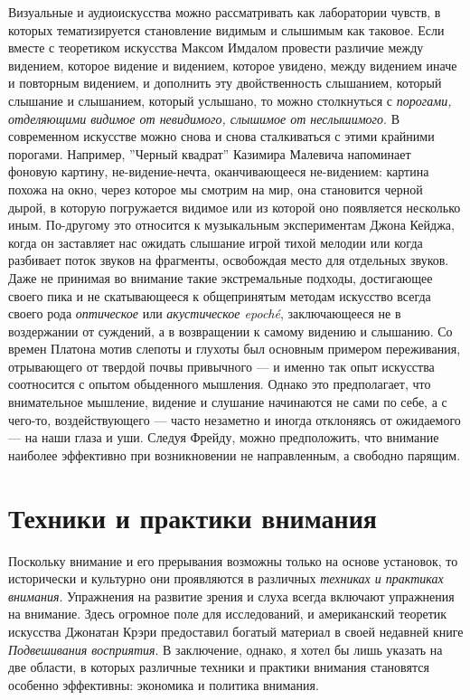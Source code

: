 \documentclass[12pt]{book}
\begin{document}
Визуальные и аудиоискусства можно рассматривать как лаборатории чувств, в которых тематизируется становление видимым и слышимым как таковое. Если вместе с теоретиком искусства Максом Имдалом провести различие между видением, которое видение и видением, которое увидено, между видением иначе и повторным видением, и дополнить эту двойственность слышанием, который слышание и слышанием, который услышано, то можно столкнуться с \textit{порогами, отделяющими видимое от невидимого, слышимое от неслышимого}. В современном искусстве можно снова и снова сталкиваться с этими крайними порогами. Например, ''Черный квадрат'' Казимира Малевича напоминает фоновую картину, не-видение-нечта, оканчивающееся не-видением: картина похожа на окно, через которое мы смотрим на мир, она становится черной дырой, в которую погружается видимое или из которой оно появляется несколько иным. По-другому это относится к музыкальным экспериментам Джона Кейджа, когда он заставляет нас ожидать слышание игрой тихой мелодии или когда разбивает поток звуков на фрагменты, освобождая место для отдельных звуков. Даже не принимая во внимание такие экстремальные подходы, достигающее своего пика и не скатывающееся к общепринятым методам искусство всегда своего рода \textit{оптическое} или \textit{акустическое epoché}, заключающееся не в воздержании от суждений, а в возвращении к самому видению и слышанию. Со времен Платона мотив слепоты и глухоты был основным примером переживания, отрывающего от твердой почвы привычного --- и именно так опыт искусства соотносится с опытом обыденного мышления.  Однако это предполагает, что внимательное мышление, видение и слушание начинаются не сами по себе, а с чего-то, воздействующего --- часто незаметно и иногда отклоняясь от ожидаемого --- на наши глаза и уши. Следуя Фрейду, можно предположить, что внимание наиболее эффективно при возникновении не направленным, а свободно парящим.

\section{Техники и практики внимания}

Поскольку внимание и его прерывания возможны только на основе установок, то исторически и культурно они проявляются в различных \textit{техниках и практиках внимания}. Упражнения на развитие зрения и слуха всегда включают упражнения на внимание. Здесь огромное поле для исследований, и американский теоретик искусства Джонатан Крэри предоставил богатый материал в своей недавней книге \textit{Подвешивания восприятия}. В заключение, однако, я хотел бы лишь указать на две области, в которых различные техники и практики внимания становятся особенно эффективны: экономика и политика внимания.
\end{document}
